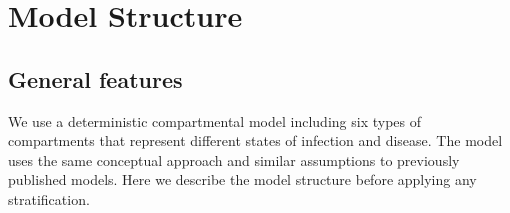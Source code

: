 
\section{Model Structure}

\subsection{General features}

We use a deterministic compartmental model including six types of compartments that represent different states of infection and disease. 
The model uses the same conceptual approach and similar assumptions to previously published models. 
Here we describe the model structure before applying any stratification.
